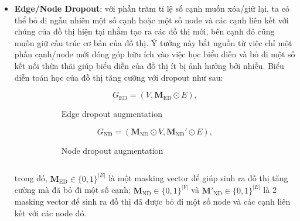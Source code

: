 \begin{itemize}
    \item[] \textbf{Edge/Node Dropout}: với phần trăm tỉ lệ số cạnh muốn xóa/giữ lại, ta có thể  bỏ đi ngẫu nhiên một số cạnh hoặc một số node và các cạnh liên kết với chúng của đồ thị hiện tại nhằm tạo ra các đồ thị mới, bên cạnh đó cũng muốn giữ cấu trúc cơ bản của đồ thị. Ý tưởng này bắt nguồn từ việc chỉ một phần cạnh/node mới đóng góp hữu ích vào việc học biểu diễn và bỏ đi một số kết nối thừa thãi giúp biểu diễn của đồ thị ít bị ảnh hưởng bởi nhiễu. Biểu diễn toán học của đồ thị tăng cường với dropout như sau:
    \vspace*{-8mm}
    \begin{figure}[H]
        \null\hfill
        \begin{subfigure}{0.41\textwidth}
            \[
            G_{\text{ED}} = (V, \mathbf{M}_{\text{ED}} \odot E),
            \]
            \caption{Edge dropout augmentation}
        \end{subfigure}
        \begin{subfigure}{0.41\textwidth}
            \[
            G_{\text{ND}} = (\mathbf{M}_{\text{ND}} \odot V, \mathbf{M}_{\text{ND}}' \odot E),
            \]
            \caption{Node dropout augmentation}
        \end{subfigure}
        \hspace*{+15mm}
        \begin{subfigure}{0\textwidth}
            \begin{equation}\end{equation}
            \vspace*{+7.5mm}
        \end{subfigure}
    \end{figure}
    trong đó, $\mathbf{M}_{\text{ED}} \in \{0, 1\}^{|E|}$ là một masking vector để giúp sinh ra đồ thị tăng cường mà đã bỏ đi một số cạnh; $\mathbf{M}_{\text{ND}} \in \{0, 1\}^{|V|}$ và $\mathbf{M'}_{\text{ND}} \in \{0, 1\}^{|E|}$ là 2 masking vector để sinh ra đồ thị đã được bỏ đi một số node và các cạnh liên kết với các node đó.
    

\end{itemize}
